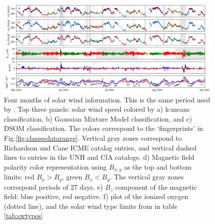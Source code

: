 \documentclass[utf8]{frontiersSCNS} %
\begin{document}
\begin{figure}[h!]
	\begin{center}
		\includegraphics[width=18cm]{Amaya/timeseries}%
	\end{center}
	\caption{Four months of solar wind information. This is the same period used by \citep{Roberts2020}. Top three panels: solar wind speed colored by a) k-means classification, b) Gaussian Mixture Model classification, and c) DSOM classification. The colors correspond to the `fingerprints' in Fig.\ref{fig:classesdatarange}. Vertical gray zones correspond to Richardson and Cane ICME catalog entries, and vertical dashed lines to entries in the UNH and CfA catalogs. d) Magnetic field polarity color representation using $B_{x,y}$ as the top and bottom limits: red $B_x>B_y$, green $B_x<B_y$. The vertical gray zones correspond periods of 27 days. e) $B_z$ component of the magnetic field: blue positive, red negative. f) plot of the ionized oxygen (dotted line), and the solar wind type limits from \citep{Zhao2009} in table \ref{tab:swtypes}}\label{fig:timeseries}
\end{figure}
\end{document}
